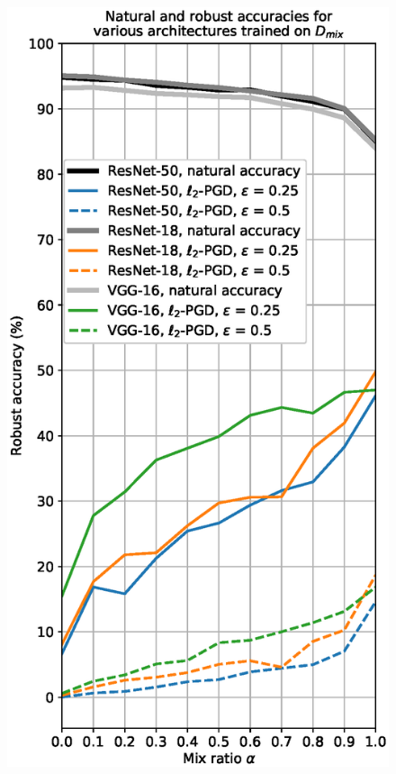 \begin{figure}[htb]
\begin{center}
\begin{minipage}[b]{0.235\textwidth}
        \end{minipage}
        \begin{minipage}[b]{0.235\textwidth}
            \includegraphics[width=\textwidth]{figs/Q2_all.eps}
        \end{minipage}

\end{center}
\end{figure}
